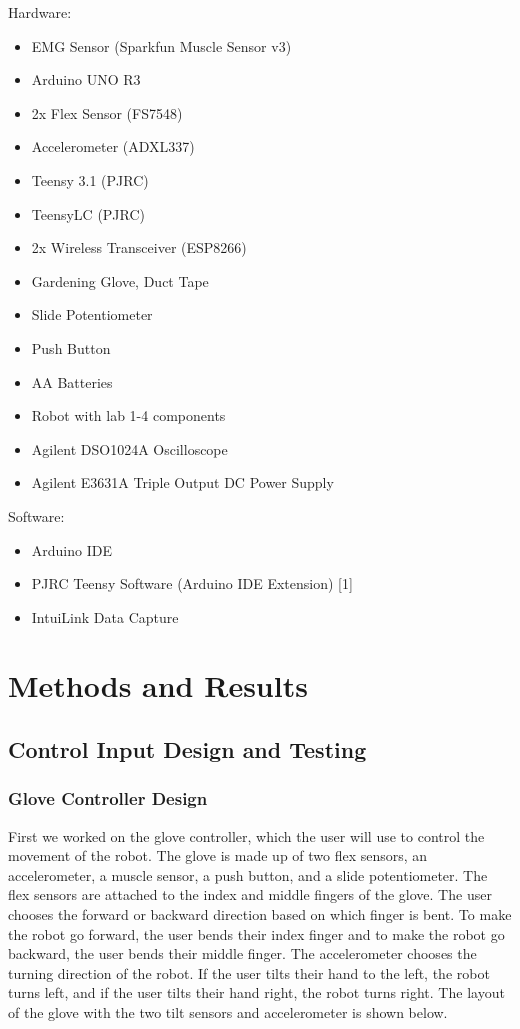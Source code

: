 \documentclass[12pt,scrartcl,titlepage]{article}
\begin{document}
\noindent Hardware:
  \begin{itemize}
  \item EMG Sensor (Sparkfun Muscle Sensor v3)
  \item Arduino UNO R3
  \item 2x Flex Sensor (FS7548)
  \item Accelerometer (ADXL337)
  \item Teensy 3.1 (PJRC)
  \item TeensyLC (PJRC)
  \item 2x Wireless Transceiver (ESP8266)
  \item Gardening Glove, Duct Tape
  \item Slide Potentiometer
  \item Push Button
  \item AA Batteries
  \item Robot with lab 1-4 components
  \item Agilent DSO1024A Oscilloscope
  \item Agilent E3631A Triple Output DC Power Supply
  \end{itemize}
  
\noindent Software:
  \begin{itemize}
  \item Arduino IDE
  \item PJRC Teensy Software (Arduino IDE Extension) [1]
  \item IntuiLink Data Capture
  \end{itemize}

  \section{Methods and Results}

  \subsection{Control Input Design and Testing}

  \subsubsection{Glove Controller Design}

  First we worked on the glove controller, which the user will use to control the movement of the robot. The glove is made up of two flex sensors, an accelerometer, a muscle sensor, a push button, and a slide potentiometer. The flex sensors are attached to the index and middle fingers of the glove. The user chooses the forward or backward direction based on which finger is bent. To make the robot go forward, the user bends their index finger and to make the robot go backward, the user bends their middle finger. The accelerometer chooses the turning direction of the robot. If the user tilts their hand to the left, the robot turns left, and if the user tilts their hand right, the robot turns right. The layout of the glove with the two tilt sensors and accelerometer is shown below.
\end{document}
